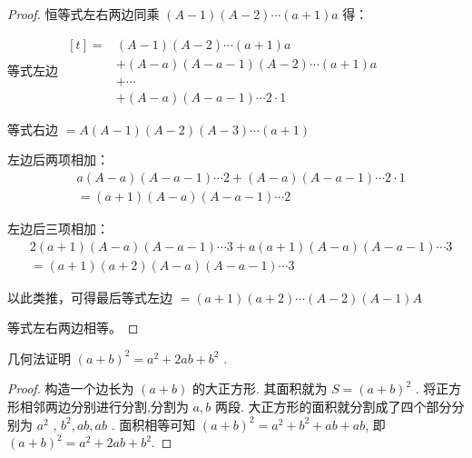 \begin{proof}
  恒等式左右两边同乘 \(\left( {A - 1}\right) \left( {A - 2}\right) \cdots \left( {a + 1}\right) a\) 得：

  等式左边 
  $
  \begin{aligned}[t]
      =&\left( {A - 1}\right) \left( {A - 2}\right) \cdots \left( {a + 1}\right) a \\
      &+ \left( {A - a}\right) \left( {A - a - 1}\right) \left( {A - 2}\right) \cdots \left( {a + 1}\right) a \\
      &+ \cdots \\
      &+ \left( {A - a}\right) \left( {A - a - 1}\right) \cdots 2 \cdot 1
  \end{aligned}$

  等式右边 \(= A\left( {A - 1}\right) \left( {A - 2}\right) \left( {A - 3}\right) \cdots \left( {a + 1}\right)\)

  左边后两项相加：
  \begin{align*}
      &a\left( {A - a}\right) \left( {A - a - 1}\right) \cdots 2 + \left( {A - a}\right) \left( {A - a - 1}\right) \cdots 2 \cdot 1 \\
      &= \left( {a + 1}\right) \left( {A - a}\right) \left( {A - a - 1}\right) \cdots 2
  \end{align*}

  左边后三项相加：
  \begin{align*}
      &2\left( {a + 1}\right) \left( {A - a}\right) \left( {A - a - 1}\right) \cdots 3 + a\left( {a + 1}\right) \left( {A - a}\right) \left( {A - a - 1}\right) \cdots 3 \\
      &= \left( {a + 1}\right) \left( {a + 2}\right) \left( {A - a}\right) \left( {A - a - 1}\right) \cdots 3
  \end{align*}

  以此类推，可得最后等式左边 \(= \left( {a + 1}\right) \left( {a + 2}\right) \cdots \left( {A - 2}\right) \left( {A - 1}\right) A\)

  等式左右两边相等。
\end{proof}



\begin{example}
  几何法证明 \({\left( a + b\right) }^{2} = {a}^{2} + {2ab} + {b}^{2}\) . 
\end{example}

\begin{proof}
  构造一个边长为 \(\left( {a + b}\right)\) 的大正方形. 其面积就为 \(S = {\left( a + b\right) }^{2}\) . 将正方形相邻两边分别进行分割,分割为 \(a,b\) 两段. 大正方形的面积就分割成了四个部分分别为 \({a}^{2}\) , \({b}^{2},{ab},{ab}\) . 面积相等可知 \({\left( a + b\right) }^{2} = {a}^{2} + {b}^{2} + {ab} + {ab}\), 即 ${\left( a + b\right) }^{2} = {a}^{2} + {2ab} + {b}^{2}$. 
\end{proof}

